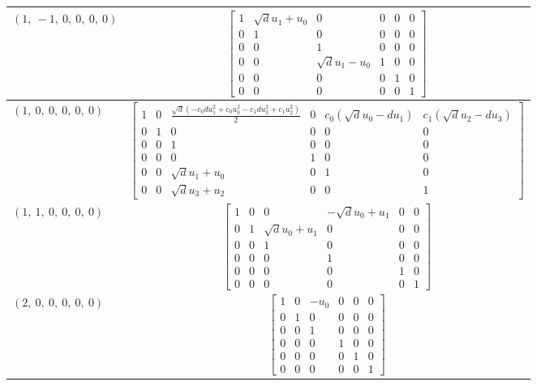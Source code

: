 \documentclass[11pt]{article}
\theoremstyle{definition}
\begin{document}
\begin{longtable}{|l|c|}
    \hline
    $\left( 1, \  -1, \  0, \  0, \  0, \  0\right)$ & ${\left[\begin{matrix}1 & \sqrt{d} u_{1} + u_{0} & 0 & 0 & 0 & 0\\0 & 1 & 0 & 0 & 0 & 0\\0 & 0 & 1 & 0 & 0 & 0\\0 & 0 & \sqrt{d} u_{1} - u_{0} & 1 & 0 & 0\\0 & 0 & 0 & 0 & 1 & 0\\0 & 0 & 0 & 0 & 0 & 1\end{matrix}\right]}$ \\
    \hline
    $\left( 1, \  0, \  0, \  0, \  0, \  0\right)$ & ${\left[\begin{matrix}1 & 0 & \frac{\sqrt{d} \left(- c_{0} d u_{1}^{2} + c_{0} u_{0}^{2} - c_{1} d u_{3}^{2} + c_{1} u_{2}^{2}\right)}{2} & 0 & c_{0} \left(\sqrt{d} u_{0} - d u_{1}\right) & c_{1} \left(\sqrt{d} u_{2} - d u_{3}\right)\\0 & 1 & 0 & 0 & 0 & 0\\0 & 0 & 1 & 0 & 0 & 0\\0 & 0 & 0 & 1 & 0 & 0\\0 & 0 & \sqrt{d} u_{1} + u_{0} & 0 & 1 & 0\\0 & 0 & \sqrt{d} u_{3} + u_{2} & 0 & 0 & 1\end{matrix}\right]}$ \\
    \hline
    $\left( 1, \  1, \  0, \  0, \  0, \  0\right)$ & ${\left[\begin{matrix}1 & 0 & 0 & - \sqrt{d} u_{0} + u_{1} & 0 & 0\\0 & 1 & \sqrt{d} u_{0} + u_{1} & 0 & 0 & 0\\0 & 0 & 1 & 0 & 0 & 0\\0 & 0 & 0 & 1 & 0 & 0\\0 & 0 & 0 & 0 & 1 & 0\\0 & 0 & 0 & 0 & 0 & 1\end{matrix}\right]}$ \\
    \hline
    $\left( 2, \  0, \  0, \  0, \  0, \  0\right)$ & ${\left[\begin{matrix}1 & 0 & - u_{0} & 0 & 0 & 0\\0 & 1 & 0 & 0 & 0 & 0\\0 & 0 & 1 & 0 & 0 & 0\\0 & 0 & 0 & 1 & 0 & 0\\0 & 0 & 0 & 0 & 1 & 0\\0 & 0 & 0 & 0 & 0 & 1\end{matrix}\right]}$ \\
    \hline
\end{longtable}
\end{document}

